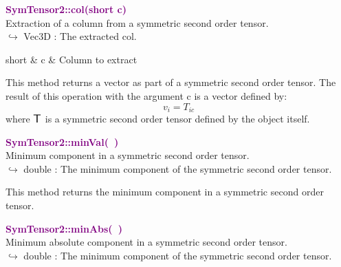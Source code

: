 \textcolor{purple}{\textbf{SymTensor2::col(short c)}}\label{SymTensor2::col(short c)}\\
Extraction of a column from a symmetric second order tensor.\\ \hspace*{10mm}$\hookrightarrow$ Vec3D : The extracted col.

\begin{tcolorbox}[width=\textwidth,myArgs,tabularx={ll|R}]
short & c & Column to extract
\end{tcolorbox}

This method returns a vector as part of a symmetric second order tensor.
The result of this operation with the argument c is a vector defined by:
\begin{equation*}
v_{i} = T_{ic}
\end{equation*}
where $\mbox{\large\ensuremath{\mathsf{T}}}$ is a symmetric second order tensor defined by the object itself.

\textcolor{purple}{\textbf{SymTensor2::minVal(~)}}\label{SymTensor2::minVal()}\\
Minimum component in a symmetric second order tensor.\\ \hspace*{10mm}$\hookrightarrow$ double : The minimum component of the symmetric second order tensor.

This method returns the minimum component in a symmetric second order tensor.

\textcolor{purple}{\textbf{SymTensor2::minAbs(~)}}\label{SymTensor2::minAbs()}\\
Minimum absolute component in a symmetric second order tensor.\\ \hspace*{10mm}$\hookrightarrow$ double : The minimum component of the symmetric second order tensor.

